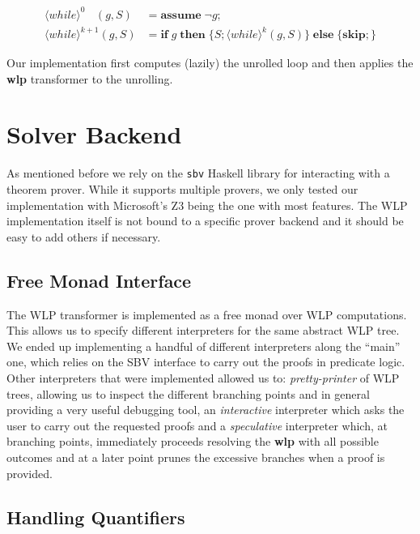 \documentclass[]{scrartcl}
\newcommand{\IF}[3]{\ensuremath{\mathbf{if}\;#1\;\mathbf{then}\;\{#2\}\;\mathbf{else}\;\{#3\}}}
\newcommand{\SKIP}{\ensuremath{\mathbf{skip};}}
\newcommand{\ASSUME}[1]{\ensuremath{\mathbf{assume}\;#1;}}
\newcommand{\UNROLLDI}[3]{\ensuremath{\langle\mathit{while}\rangle^{#1}(#2, #3)}}
\begin{document}
\begin{align}
\UNROLLDI{0\phantom{+1}}{g}{S} &= \ASSUME{\neg g} \\
\UNROLLDI{k+1}{g}{S} &= \IF{g}{S; \UNROLLDI{k}{g}{S}}{\SKIP}
\end{align}

Our implementation first computes (lazily) the unrolled loop and then applies
the \textbf{wlp} transformer to the unrolling.

\section{Solver Backend}

As mentioned before we rely on the \texttt{sbv} Haskell library for interacting with a theorem prover.
While it supports multiple provers, we only tested our implementation with Microsoft's Z3 being the
one with most features.
The WLP implementation itself is not bound to a specific prover backend and it should be easy to
add others if necessary.

\subsection{Free Monad Interface}

The WLP transformer is implemented as a free monad over WLP computations.
This allows us to specify different interpreters for the same abstract WLP tree.
We ended up implementing a handful of different interpreters along the ``main''
one, which relies on the SBV interface to carry out the proofs in predicate logic.
Other interpreters that were implemented allowed us to: \textit{pretty-printer} of WLP trees,
allowing us to inspect the different branching points and in general providing
a very useful debugging tool, an \textit{interactive} interpreter which asks the user
to carry out the requested proofs and a \textit{speculative} interpreter which, at branching
points, immediately proceeds resolving the \textbf{wlp} with all possible outcomes and
at a later point prunes the excessive branches when a proof is provided.

\subsection{Handling Quantifiers}
\end{document}

